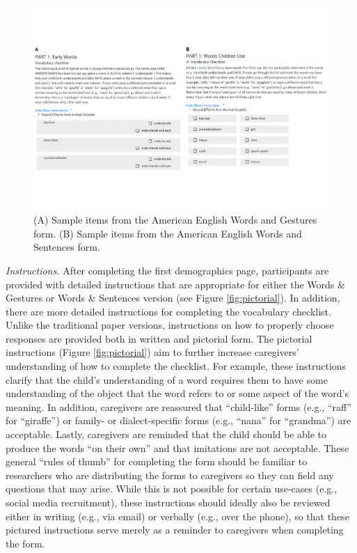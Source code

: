 \documentclass[
  english,
  ,man,floatsintext]{apa6}
\begin{document}
\begin{figure}
\centering
\includegraphics{webcdi_paper_files/figure-latex/firstitems-1.pdf}
\caption{\label{fig:firstitems}(A) Sample items from the American English Words and Gestures form. (B) Sample items from the American English Words and Sentences form.}
\end{figure}

\emph{Instructions.} After completing the first demographics page, participants are provided with detailed instructions that are appropriate for either the Words \& Gestures or Words \& Sentences version (see Figure \ref{fig:pictorial}). In addition, there are more detailed instructions for completing the vocabulary checklist. Unlike the traditional paper versions, instructions on how to properly choose responses are provided both in written and pictorial form. The pictorial instructions (Figure \ref{fig:pictorial}) aim to further increase caregivers' understanding of how to complete the checklist. For example, these instructions clarify that the child's understanding of a word requires them to have some understanding of the object that the word refers to or some aspect of the word's meaning. In addition, caregivers are reassured that ``child-like'' forms (e.g., ``raff'' for ``giraffe'') or family- or dialect-specific forms (e.g., ``nana'' for ``grandma'') are acceptable. Lastly, caregivers are reminded that the child should be able to produce the words ``on their own'' and that imitations are not acceptable. These general ``rules of thumb'' for completing the form should be familiar to researchers who are distributing the forms to caregivers so they can field any questions that may arise. While this is not possible for certain use-cases (e.g., social media recruitment), these instructions should ideally also be reviewed either in writing (e.g., via email) or verbally (e.g., over the phone), so that these pictured instructions serve merely as a reminder to caregivers when completing the form.
\end{document}
